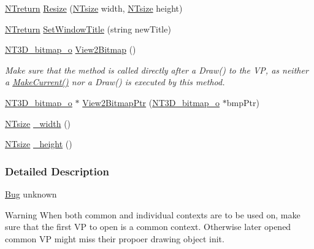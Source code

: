 \begin{DoxyCompactItemize}
\hyperlink{nt__types_8h_ab9564ee8f091e809d21b8451c6683c53}{NTreturn} \hyperlink{class_n_t3_d__glx__drv__o_a1de11d5056f58196f42a555bf36cc70f}{Resize} (\hyperlink{nt__types_8h_a06c124f2e4469769b58230253ce0560b}{NTsize} width, \hyperlink{nt__types_8h_a06c124f2e4469769b58230253ce0560b}{NTsize} height)
\item 
\hyperlink{nt__types_8h_ab9564ee8f091e809d21b8451c6683c53}{NTreturn} \hyperlink{class_n_t3_d__glx__drv__o_a539eff709d877c6553d1487f97acf86e}{SetWindowTitle} (string newTitle)
\item 
\hyperlink{class_n_t3_d__bitmap__o}{NT3D\_\-bitmap\_\-o} \hyperlink{class_n_t3_d__glx__drv__o_a10e149c94f3063ab5536bd0f4724a692}{View2Bitmap} ()
\begin{DoxyCompactList}\small\item\em Make sure that the method is called directly after a Draw() to the VP, as neither a \hyperlink{class_n_t3_d__glx__drv__o_a87a4df668792c821049de5cb08e6a506}{MakeCurrent()} nor a Draw() is executed by this method. \item\end{DoxyCompactList}\item 
\hyperlink{class_n_t3_d__bitmap__o}{NT3D\_\-bitmap\_\-o} $\ast$ \hyperlink{class_n_t3_d__glx__drv__o_ac77add5595df936c23417c191ed41431}{View2BitmapPtr} (\hyperlink{class_n_t3_d__bitmap__o}{NT3D\_\-bitmap\_\-o} $\ast$bmpPtr)
\item 
\hyperlink{nt__types_8h_a06c124f2e4469769b58230253ce0560b}{NTsize} \hyperlink{class_n_t3_d__glx__drv__o_a654a7d3407326315d7267df1f82af8ef}{\_\-width} ()
\item 
\hyperlink{nt__types_8h_a06c124f2e4469769b58230253ce0560b}{NTsize} \hyperlink{class_n_t3_d__glx__drv__o_a020a9283b49cb9de0dc7ed27875ae40f}{\_\-height} ()
\end{DoxyCompactItemize}


\subsubsection{Detailed Description}
\begin{Desc}
\item[\hyperlink{bug__bug000016}{Bug}]unknown \end{Desc}
\begin{DoxyWarning}{Warning}
When both common and individual contexts are to be used on, make sure that the first VP to open is a common context. Otherwise later opened common VP might miss their propoer drawing object init. 
\end{DoxyWarning}



